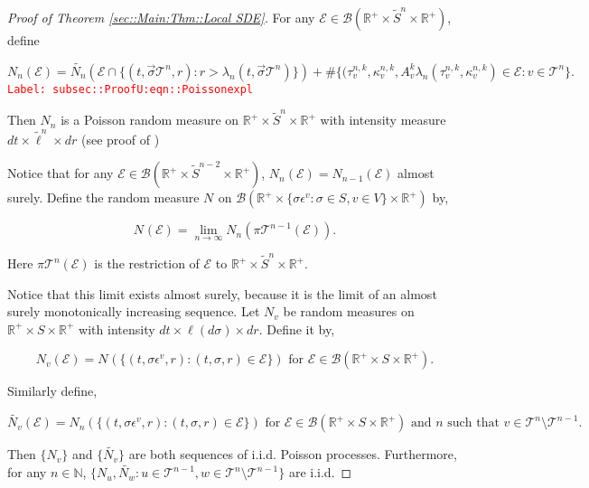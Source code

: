 \documentclass[12pt]{article}
\newcommand{\mb}{\mathbb}
\newcommand{\mc}{\mathcal}
\newcommand{\ms}{\mathscr}
\newcommand{\ra}{\rightarrow}
\newcommand{\te}{\text}
\newcommand{\ep}{\epsilon}
\newcommand{\tr}{\textcolor{red}}
\newcommand{\labe}[1]{\tr{\texttt{Label: #1}}}
\newcommand{\ind}{\hspace{24pt}}
\renewcommand{\v}{v}							%
\newcommand{\vv}{u}								%
\newcommand{\vvv}{w}							%
\renewcommand{\S}{S}							%
\newcommand{\s}{\sigma}							%
\newcommand{\sv}{\vec{\s}}						%
\newcommand{\ev}[1]{\ep^{#1}}					%
\renewcommand{\t}{t}							%
\newcommand{\proj}{\pi}							%
\newcommand{\poiss}[1]{N_{#1}}						%
\newcommand{\pup}[1]{^{#1}}							%
\newcommand{\tree}{\mc{T}}							%
\renewcommand{\r}{r}								%
\newcommand{\rt}[1]{\tau^{#1}}						%
\renewcommand{\it}{k}								%
\newcommand{\numb}{n}								%
\newcommand{\XState}[1]{\S^{#1}}				%
\newcommand{\rate}[1]{\lambda_{#1}}					%
\newcommand{\Sm}{\ell}								%
\newcommand{\alt}{\widetilde}						%
\newcommand{\rv}{A}								%
\newcommand{\evnt}{\mc{E}}						%
\renewcommand{\mark}[1]{\kappa^{#1}}				%
\begin{document}
\begin{proof}[Proof of Theorem \ref{sec::Main:Thm::Local SDE}]
For any \(\evnt \in \ms{B}(\mb{R}^+\times\alt{\S}^\numb\times\mb{R}^+)\), define

\begin{equation}
\poiss{\numb}(\evnt) = \alt{\poiss{\numb}}\left(\evnt\cap\{(t,\sv{\tree\pup{\numb}},\r):\r > \rate{\numb}(\t,\sv{\tree\pup{\numb}})\}\right) + \#\{(\rt{\numb,\it}_\v,\mark{\numb,\it}_\v,\rv_{\v}^{\it}\rate{\numb}(\rt{\numb,\it}_\v,\mark{\numb,\it}_\v) \in \evnt: \v\in \tree\pup{\numb}\}.
\label{subsec::ProofU:eqn::Poissonexpl}
\end{equation}
\labe{subsec::ProofU:eqn::Poissonexpl}

Then \(\poiss{\numb}\) is a Poisson random measure on \(\mb{R}^+\times\alt{\S}^\numb\times \mb{R}^+\) with intensity measure \(d\t\times \alt{\Sm}^\numb\times d\r\) (see proof of \cite[Theorem 14.7.1(b)]{DalVer08})

\ind Notice that for any \(\evnt \in \ms{B}(\mb{R}^+\times \alt{\S}^{\numb-2}\times \mb{R}^+)\), \(\poiss{\numb}(\evnt) = \poiss{\numb-1}(\evnt)\) almost surely. Define the random measure \(\poiss{}\) on \(\ms{B}(\mb{R}^+\times \{\s\ev{\v}:\s\in \S,\v \in  V\}\times \mb{R}^+)\) by,

\[\poiss{}(\evnt) = \lim_{\numb \ra\infty}\poiss{\numb}\left(\proj{\tree\pup{\numb-1}}{}(\evnt)\right).\]

Here \(\proj{\tree\pup{\numb}}{}(\evnt)\) is the restriction of \(\evnt\) to \(\mb{R}^+\times \alt{\S}^\numb\times\mb{R}^+\). 

\ind Notice that this limit exists almost surely, because it is the limit of an almost surely monotonically increasing sequence. Let \(\poiss{\v}\) be random measures on \(\mb{R}^+\times\S\times\mb{R}^+\) with intensity \(d\t\times\Sm(d\s)\times d\r\). Define it by,

\[\poiss{\v}(\evnt) = \poiss{}\left(\{(\t,\s\ev{\v},\r):(\t,\s,\r)\in \evnt\}\right) \te{ for } \evnt \in \ms{B}(\mb{R}^+\times\S\times\mb{R}^+).\]

Similarly define,

\[\alt{\poiss{\v}}(\evnt) = \poiss{\numb}\left(\{(\t,\s\ev{\v},\r):(\t,\s,\r)\in \evnt\}\right)\te{ for } \evnt \in \ms{B}(\mb{R}^+\times\S\times\mb{R}^+)\te{ and }\numb\te{ such that } \v\in \tree\pup{\numb}\setminus\tree\pup{\numb-1}.\]

Then \(\{\poiss{\v}\}\) and \(\{\alt{\poiss{\v}}\}\) are both sequences of i.i.d. Poisson processes. Furthermore, for any \(\numb \in \mb{N}\), \(\{\poiss{\vv},\alt{\poiss{\vvv}}:\vv\in \tree\pup{\numb-1},\vvv\in\tree\pup{\numb}\setminus\tree\pup{\numb-1}\}\) are i.i.d.


\end{proof}
\end{document}
